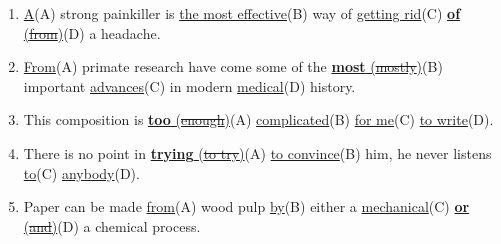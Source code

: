 \documentclass[main.tex]{subfiles}
\begin{document}

\begin{enumerate}[nosep,leftmargin=10mm]
	\itemsep\eitsp
	\setcounter{enumi}{20}
	\item \uline{A}(A) strong painkiller is \uline{the most effective}(B) way of \uline{getting rid}(C) \uline{\textbf{of} (\sout{from})}(D) a headache.
	\item \uline{From}(A) primate research have come some of the \uline{\textbf{most} (\sout{mostly})}(B) important \uline{advances}(C) in modern \uline{medical}(D) history.
	\item This composition is \uline{\textbf{too} (\sout{enough})}(A) \uline{complicated}(B) \uline{for me}(C) \uline{to write}(D).
	\item There is no point in \uline{\textbf{trying} (\sout{to try})}(A) \uline{to convince}(B) him, he never listens \uline{to}(C) \uline{anybody}(D).
	\item Paper can be made \uline{from}(A) wood pulp \uline{by}(B) either a \uline{mechanical}(C) \uline{\textbf{or} (\sout{and})}(D) a chemical process.
\end{enumerate}
\ 

\end{document}
